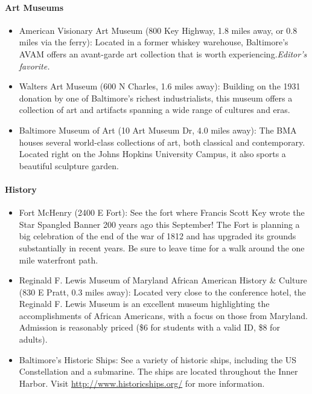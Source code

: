 \paragraph*{Art Museums}
\begin{itemize}
\item{American Visionary Art Museum (800 Key Highway, 1.8 miles away, or 0.8 miles via the ferry): Located in a former whiskey warehouse, Baltimore's AVAM offers an avant-garde art collection that is worth experiencing.\it{Editor's favorite}.}
\item{Walters Art Museum (600 N Charles, 1.6 miles away): Building on the 1931 donation by one of Baltimore's richest industrialists, this museum offers a collection of art and artifacts spanning a wide range of cultures and eras.}
\item{Baltimore Museum of Art (10 Art Museum Dr, 4.0 miles away): The BMA houses several world-class collections of art, both classical and contemporary. Located right on the Johns Hopkins University Campus, it also sports a beautiful sculpture garden.}
\end{itemize}

\paragraph*{History}
\begin{itemize}
\item{Fort McHenry (2400 E Fort): See the fort where Francis Scott Key wrote the Star Spangled Banner 200 years ago this September! The Fort is planning a big celebration of the end of the war of 1812 and has upgraded its grounds substantially in recent years. Be sure to leave time for a walk around the one mile waterfront path.}
\item{Reginald F. Lewis Museum of Maryland African American History \& Culture (830 E Pratt, 0.3 miles away): Located very close to the conference hotel, the Reginald F. Lewis Museum is an excellent museum highlighting the accomplishments of African Americans, with a focus on those from Maryland. Admission is reasonably priced (\$6 for students with a valid ID, \$8 for adults).}
\item{Baltimore's Historic Ships: See a variety of historic ships, including the US Constellation and a submarine. The ships are located throughout the Inner Harbor. Visit \url{http://www.historicships.org/} for more information.}
\end{itemize}

